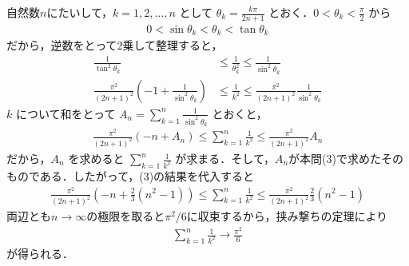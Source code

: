 \documentclass[a4paper,10pt]{ltjsarticle}
\begin{document}
\begin{multicols}{2}
自然数$n$にたいして，$k=1,2,\dots,n$ として $\theta_k = \frac{k\pi}{2n+1}$ とおく．$0 < \theta_k < \frac{\pi}{2}$ から 
\begin{align}
 0 < \sin\theta_k < \theta_k < \tan\theta_k
\end{align}
だから，逆数をとって2乗して整理すると，
\begin{align*}
 \frac{1}{\tan^2\theta_k} &\le \frac{1}{\theta_k^2} \le \frac{1}{\sin^2\theta_k} \\
 \frac{\pi^2}{(2n+1)^2} \left(-1 + \frac{1}{\sin^2\theta_k}\right) &\le \frac{1}{k^2} \le \frac{\pi^2}{(2n+1)^2} \frac{1}{\sin^2\theta_k}
\end{align*}
$k$ について和をとって $\displaystyle A_n = \sum_{k=1}^n \frac{1}{\sin^2\theta_k}$ とおくと，
\begin{align}
\frac{\pi^2}{(2n+1)^2} \left(-n + A_n\right) \le \sum_{k=1}^n \frac{1}{k^2} \le \frac{\pi^2}{(2n+1)^2} A_n
\end{align}
だから，$A_n$ を求めると $\displaystyle \sum_{k=1}^n \frac{1}{k^2}$ が求まる．そして，$A_n$が本問(3)で求めたそのものである．したがって，(3)の結果を代入すると
\begin{align*}
  \frac{\pi^2}{(2n+1)^2} \left(-n + \frac{2}{3}(n^2-1)\right) \le \sum_{k=1}^n \frac{1}{k^2} \le \frac{\pi^2}{(2n+1)^2} \frac{2}{3}(n^2-1)
\end{align*}
両辺とも$n\to\infty$の極限を取ると$\pi^2/6$に収束するから，挟み撃ちの定理により
\begin{align*}
 \sum_{k=1}^n \frac{1}{k^2} \longrightarrow \frac{\pi^2}{6}
\end{align*}
が得られる．


\newpage
\end{multicols}
\end{document}
